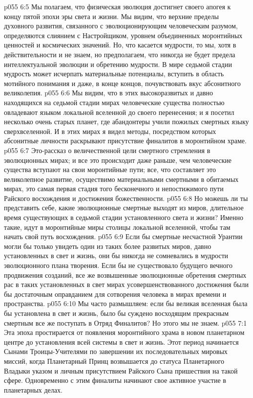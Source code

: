 \vs p055 6:5 Мы полагаем, что физическая эволюция достигнет своего апогея к концу пятой эпохи эры света и жизни. Мы видим, что верхние пределы духовного развития, связанного с эволюционирующим человеческим разумом, определяются слиянием с Настройщиком, уровнем объединенных моронтийных ценностей и космических значений. Но, что касается мудрости, то мы, хотя в действительности и не знаем, но предполагаем, что никогда не будет предела интеллектуальной эволюции и обретению мудрости. В мире седьмой стадии мудрость может исчерпать материальные потенциалы, вступить в область мотийного понимания и даже, в конце концов, почувствовать вкус абсонитного великолепия.
\vs p055 6:6 Мы видим, что в этих высокоразвитых и давно находящихся на седьмой стадии мирах человеческие существа полностью овладевают языком локальной вселенной до своего перенесения; и я посетил несколько очень старых планет, где абандонтеры учили пожилых смертных языку сверхвселенной. И в этих мирах я видел методы, посредством которых абсонитные личности раскрывают присутствие финалитов в моронтийном храме.
\vs p055 6:7 \pc Это\hyp{}рассказ о величественной цели смертного стремления в эволюционных мирах; и все это происходит даже раньше, чем человеческие существа вступают на свои моронтийные пути; все, что составляет это великолепное развитие, осуществимо материальными смертными в обитаемых мирах, это самая первая стадия того бесконечного и непостижимого пути Райского восхождения и достижения божественности.
\vs p055 6:8 Но можешь ли ты представить себе, какие эволюционные смертные выходят из миров, длительное время существующих в седьмой стадии установленного света и жизни? Именно такие, идут в моронтийные миры столицы локальной вселенной, чтобы там начать свой путь восхождения.
\vs p055 6:9 Если бы смертные несчастной Урантии могли бы только увидеть один из таких более развитых миров, давно установленных в свет и жизнь, они бы никогда не сомневались в мудрости эволюционного плана творения. Если бы не существовало будущего вечного продвижения созданий, все же возвышенные эволюционные обретения смертных рас в таких установленных в свет мирах усовершенствованного достижения были бы достаточным оправданием для сотворения человека в мирах времени и пространства.
\vs p055 6:10 Мы часто размышляем: если бы великая вселенная была бы установлена в свет и жизнь, было бы суждено восходящим прекрасным смертным все же поступать в Отряд Финалитов? Но этого мы не знаем.
\vs p055 7:1 Эта эпоха простирается от появления моронтийного храма в новом планетарном центре до установления всей системы в свет и жизнь. Этот период начинается Сынами Троицы\hyp{}Учителями по завершении их последовательных мировых миссий, когда Планетарный Принц возвышается до статуса Планетарного Владыки указом и личным присутствием Райского Сына пришествия на такой сфере. Одновременно с этим финалиты начинают свое активное участие в планетарных делах.
